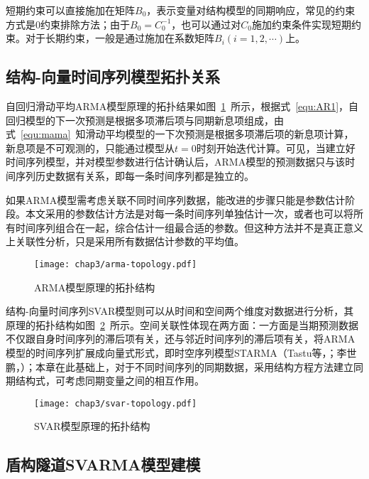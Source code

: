短期约束可以直接施加在矩阵$B_0$，表示变量对结构模型的同期响应，常见的约束方式是0约束排除方法；由于$B_0=C_0^{-1}$，也可以通过对$C_0$施加约束条件实现短期约束。对于长期约束，一般是通过施加在系数矩阵$B_i(i=1,2,\cdots )$上。

\subsection{结构-向量时间序列模型拓扑关系}

自回归滑动平均ARMA模型原理的拓扑结果如图~\ref{fig:ARMA模型原理的拓扑结构}~所示，根据式~\ref{equ:AR1}，自回归模型的下一次预测是根据多项滞后项与同期新息项组成，由式~\ref{equ:mama}~知滑动平均模型的一下次预测是根据多项滞后项的新息项计算，新息项是不可观测的，只能通过模型从$t=0$时刻开始迭代计算。可见，当建立好时间序列模型，并对模型参数进行估计确认后，ARMA模型的预测数据只与该时间序列历史数据有关系，即每一条时间序列都是独立的。

如果ARMA模型需考虑关联不同时间序列数据，能改进的步骤只能是参数估计阶段。本文采用的参数估计方法是对每一条时间序列单独估计一次，或者也可以将所有时间序列组合在一起，综合估计一组最合适的参数。但这种方法并不是真正意义上关联性分析，只是采用所有数据估计参数的平均值。

\begin{figure}[htb!]
    \centering
    \texttt{[image: chap3/arma-topology.pdf]}
    \caption{ARMA模型原理的拓扑结构}
    \label{fig:ARMA模型原理的拓扑结构}
\end{figure}

结构-向量时间序列SVAR模型则可以从时间和空间两个维度对数据进行分析，其原理的拓扑结构如图~\ref{fig:SVAR模型原理的拓扑结构}~所示。空间关联性体现在两方面：一方面是当期预测数据不仅跟自身时间序列的滞后项有关，还与邻近时间序列的滞后项有关，将ARMA模型的时间序列扩展成向量式形式，即时空序列模型STARMA（Tastu等，\citeyear{Tastu2011Spatio}；李世鹏，\citeyear{李世鹏2014基于时空序列模型的变形分析研究}）；本章在此基础上，对于不同时间序列的同期数据，采用结构方程方法建立同期结构式，可考虑同期变量之间的相互作用。

\begin{figure}[htb!]
    \centering
    \texttt{[image: chap3/svar-topology.pdf]}
    \caption{SVAR模型原理的拓扑结构}
    \label{fig:SVAR模型原理的拓扑结构}
\end{figure}


\subsection{盾构隧道SVARMA模型建模}

